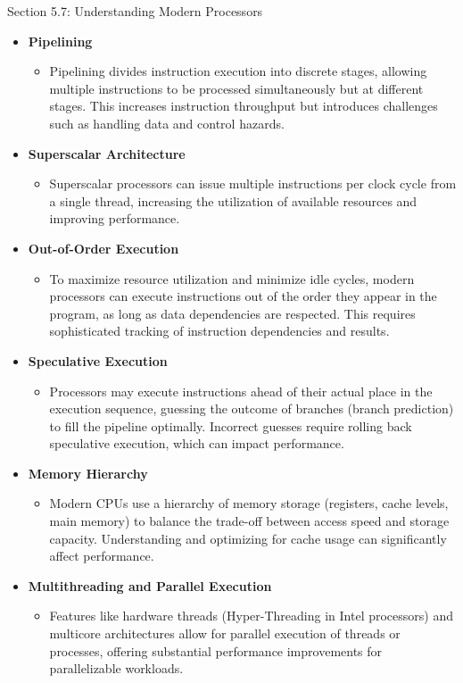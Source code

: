 \begin{notes}{Section 5.7: Understanding Modern Processors}
    \begin{itemize}
        \item \textbf{Pipelining}
        \begin{itemize}
            \item Pipelining divides instruction execution into discrete stages, allowing multiple instructions to be processed simultaneously but at different stages. This increases instruction 
            throughput but introduces challenges such as handling data and control hazards.
        \end{itemize}
        \item \textbf{Superscalar Architecture}
        \begin{itemize}
            \item Superscalar processors can issue multiple instructions per clock cycle from a single thread, increasing the utilization of available resources and improving performance.
        \end{itemize}
        \item \textbf{Out-of-Order Execution}
        \begin{itemize}
            \item To maximize resource utilization and minimize idle cycles, modern processors can execute instructions out of the order they appear in the program, as long as data dependencies are 
            respected. This requires sophisticated tracking of instruction dependencies and results.
        \end{itemize}
        \item \textbf{Speculative Execution}
        \begin{itemize}
            \item Processors may execute instructions ahead of their actual place in the execution sequence, guessing the outcome of branches (branch prediction) to fill the pipeline optimally. Incorrect 
            guesses require rolling back speculative execution, which can impact performance.
        \end{itemize}
        \item \textbf{Memory Hierarchy}
        \begin{itemize}
            \item Modern CPUs use a hierarchy of memory storage (registers, cache levels, main memory) to balance the trade-off between access speed and storage capacity. Understanding and optimizing 
            for cache usage can significantly affect performance.
        \end{itemize}
        \item \textbf{Multithreading and Parallel Execution}
        \begin{itemize}
            \item Features like hardware threads (Hyper-Threading in Intel processors) and multicore architectures allow for parallel execution of threads or processes, offering substantial performance 
            improvements for parallelizable workloads.
        \end{itemize}
    \end{itemize}
    

\end{notes}
